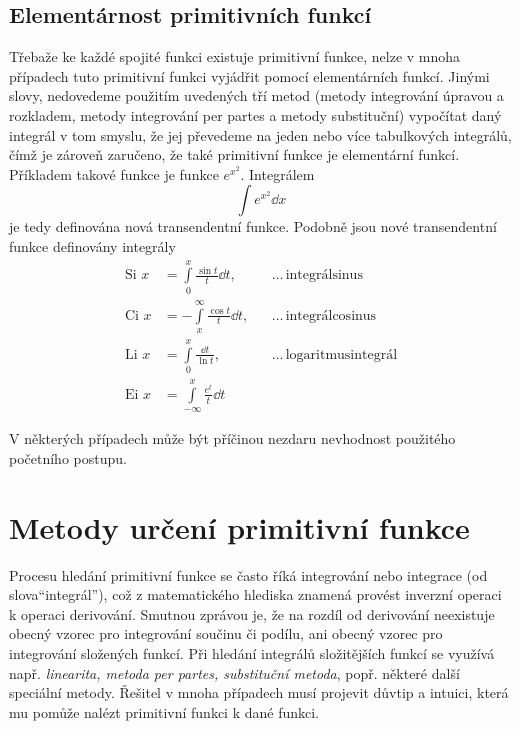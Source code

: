     \subsection{Elementárnost primitivních funkcí}\label{mai:IchapVIIsecIIssecII} 
      Třebaže ke každé spojité funkci existuje primitivní funkce, nelze v mnoha případech tuto
      primitivní funkci vyjádřit pomocí elementárních funkcí. Jinými slovy, nedovedeme použitím
      uvedených tří metod (metody integrování úpravou a rozkladem, metody integrování per partes a
      metody substituční) vypočítat daný integrál v tom smyslu, že jej převedeme na jeden nebo více
      tabulkových integrálů, čímž je zároveň zaručeno, že také primitivní funkce je elementární
      funkcí. Příkladem takové funkce je funkce
      \(e^{x^2}\). Integrálem
      \begin{equation*}
        \int e^{x^2}\dd{x}
      \end{equation*}
      je tedy definována nová transendentní funkce. Podobně jsou nové transendentní funkce
      definovány integrály
      \begin{align*}
        \text{Si }x 
          &= \int\limits_0^x     \frac{\sin t}{t}\dd{t},&&\ldots\,\text{integrálsinus}       \\
        \text{Ci }x 
          &=-\int\limits_x^\infty\frac{\cos t}{t}\dd{t},&&\ldots\,\text{integrálcosinus}     \\
        \text{Li }x 
          &= \int\limits_0^x     \frac{\dd{t}}{\ln t},  &&\ldots\,\text{logaritmusintegrál}  \\
        \text{Ei }x 
          &= \int\limits_{-\infty}^x \frac{e^t}{t}\dd{t}&&   
      \end{align*}

      V některých případech může být příčinou nezdaru nevhodnost použitého početního postupu. 

  \section{Metody určení primitivní funkce}\label{mai:IchapVIIsecIII}
    Procesu hledání primitivní funkce se často říká integrování nebo integrace (od slova“integrál”),
    což z matematického hlediska znamená provést inverzní operaci k operaci derivování. Smutnou
    zprávou je, že na rozdíl od derivování neexistuje obecný vzorec pro integrování součinu či
    podílu, ani obecný vzorec pro integrování složených funkcí. Při hledání integrálů složitějších
    funkcí se využívá např. \emph{linearita, metoda per partes, substituční metoda}, popř. některé
    další speciální metody. Řešitel v mnoha případech musí projevit důvtip a intuici, která mu
    pomůže nalézt primitivní funkci k dané funkci.

